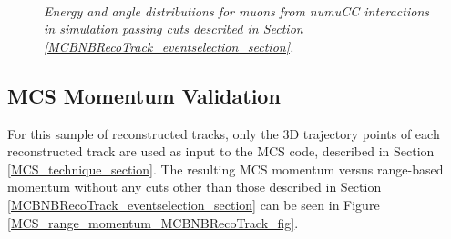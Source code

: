 \begin{figure}
\centering
\mbox{
	\quad
	}
\caption{\textit{Energy and angle distributions for muons from numuCC interactions in \ub simulation passing cuts described in Section \ref{MCBNBRecoTrack_eventselection_section}.}}
\label{BNBmuon_energy_angle_fig}
\end{figure}




\subsection{MCS Momentum Validation}\label{MCS_Momentum_Validation_MCBNBRecoTrack_section}
For this sample of reconstructed tracks, only the 3D trajectory points of each reconstructed track are used as input to the MCS code, described in Section \ref{MCS_technique_section}. The resulting MCS momentum versus range-based momentum without any cuts other than those described in Section \ref{MCBNBRecoTrack_eventselection_section} can be seen in Figure \ref{MCS_range_momentum_MCBNBRecoTrack_fig}. \\

